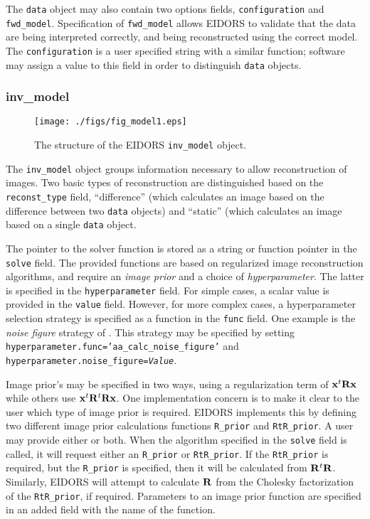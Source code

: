\documentclass[12pt]{iopart}
\begin{document}
The {\tt data} object may also contain two options fields,
{\tt configuration} and {\tt fwd\_model}. Specification
of {\tt fwd\_model} allows EIDORS to validate that the
data are being interpreted correctly, and being reconstructed
using the correct model. The {\tt configuration} is
a user specified string with a similar function; software
may assign a value to this field in order to distinguish
{\tt data} objects.


\subsubsection{inv\_model}

%
%
\begin{figure}[th]
\begin{flushright}
\texttt{[image: ./figs/fig\_model1.eps]}
\caption{\small The structure of the EIDORS {\tt inv\_model} object.
\label{fig:inv_model}
 }
\end{flushright}
\end{figure}

The {\tt inv\_model} object groups information necessary to 
allow reconstruction of images. Two basic types of reconstruction
are distinguished based on the {\tt reconst\_type} field, 
``difference'' (which calculates an image based on the difference
between two {\tt data} objects) and ``static'' (which calculates an
image based on a single {\tt data} object.

The pointer to the solver function is stored as a string or function
pointer in the {\tt solve} field. The provided functions are based
on regularized image reconstruction algorithms, and require 
an {\em image prior} and a choice of {\em hyperparameter}. 
The latter is specified in the {\tt hyperparameter} field. For
simple cases, a scalar value is provided in the {\tt value} field.
However, for more complex cases, a hyperparameter selection strategy
is specified as a function in the {\tt func} field. One example
is the {\em noise figure} strategy of \cite{Adler_and_Guardo_1996}.
This strategy may be specified by setting
 {\tt hyperparameter.func='aa\_calc\_noise\_figure'}
and 
 {\tt hyperparameter.noise\_figure=\em Value}.

Image prior's may be specified in two ways, using a 
regularization term of ${\bf x}^t{\bf R}{\bf x}$
while others use ${\bf x}^t{\bf R}^t{\bf R}{\bf x}$.
One implementation concern is to make it clear to the
user which type of image prior is required. EIDORS
implements this by defining two different image prior
calculations functions {\tt R\_prior} and {\tt RtR\_prior}.
A user may provide either or both. When the algorithm
specified in the {\tt solve} field is called, it will request
either an {\tt R\_prior} or {\tt RtR\_prior}. If the 
{\tt RtR\_prior} is required, but the {\tt R\_prior} 
is specified, then it will be calculated from ${\bf R}^t{\bf R}$.
Similarly, EIDORS will attempt to calculate ${\bf R}$ 
from the Cholesky factorization of the {\tt RtR\_prior},
if required. Parameters to an image prior function are
specified in an added field with the name of the function.
\end{document}
